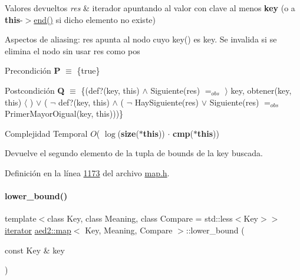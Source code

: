 \begin{DoxyRetVals}{Valores devueltos}
{\em res} & iterador apuntando al valor con clave al menos {\bfseries key} (o a {\bfseries this}-\/$>$\hyperlink{classaed2_1_1map_a76023e6a56cb625513e1b5ea028bf983_a76023e6a56cb625513e1b5ea028bf983}{end()} si dicho elemento no existe)\\
\hline
\end{DoxyRetVals}
\begin{DoxyParagraph}{Aspectos de aliasing\+:}
res apunta al nodo cuyo key() es key. Se invalida si se elimina el nodo sin usar res como pos
\end{DoxyParagraph}
\begin{DoxyPrecond}{Precondición}
{\bfseries P} $\equiv$ \{true\} 
\end{DoxyPrecond}
\begin{DoxyPostcond}{Postcondición}
{\bfseries Q} $\equiv$ \{(def?(key, this) $\land$ Siguiente(res) $=_{obs}$ $\rangle$ key, obtener(key, this) $\langle$ ) $\lor$ ( $\lnot$ def?(key, this) $\land$ ( $\lnot$ Hay\+Siguiente(res) $\lor$ Siguiente(res) $=_{obs}$ Primer\+Mayor\+Oigual(key, this)))\}
\end{DoxyPostcond}

\begin{DoxyDescription}
\item[Complejidad Temporal]$O$( $\log$({\bfseries size}({\bfseries $\ast$this})) $\cdot$ {\bfseries cmp}({\bfseries $\ast$this}))
\end{DoxyDescription}

Devuelve el segundo elemento de la tupla de bounds de la key buscada. 

Definición en la línea \hyperlink{map_8h_source_l01173}{1173} del archivo \hyperlink{map_8h_source}{map.\+h}.

\mbox{\label{classaed2_1_1map_a07b3dd65557c59ee085e5f211269c6b3_a07b3dd65557c59ee085e5f211269c6b3}} 
\paragraph{\texorpdfstring{lower\+\_\+bound()}{lower\_bound()}\hspace{0.1cm}{\footnotesize\ttfamily [2/2]}}
{\footnotesize\ttfamily template$<$class Key, class Meaning, class Compare = std\+::less$<$\+Key$>$$>$ \\
\hyperlink{classaed2_1_1map_1_1iterator}{iterator} \hyperlink{classaed2_1_1map}{aed2\+::map}$<$ Key, Meaning, Compare $>$\+::lower\+\_\+bound (\begin{DoxyParamCaption}\item[{const Key \&}]{key }\end{DoxyParamCaption})\hspace{0.3cm}{\ttfamily [inline]}}

